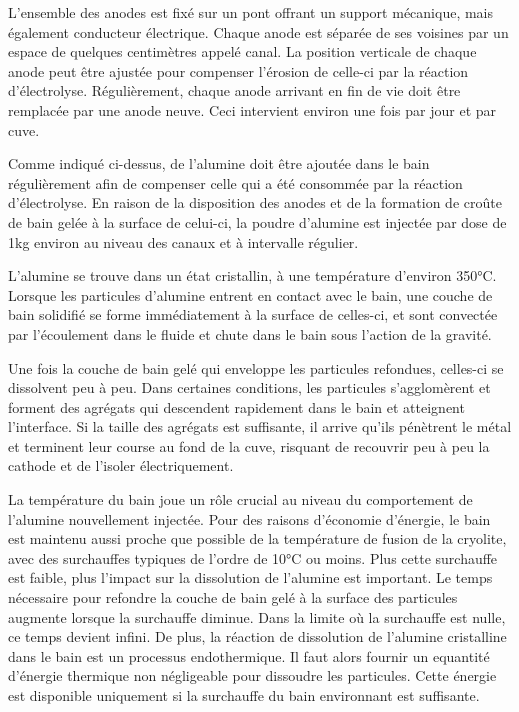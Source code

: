 L'ensemble des anodes est fixé sur un pont offrant un support
mécanique, mais également conducteur électrique. Chaque anode est
séparée de ses voisines par un espace de quelques centimètres appelé
canal. La position verticale de chaque anode peut être ajustée pour
compenser l'érosion de celle-ci par la réaction
d'électrolyse. Régulièrement, chaque anode arrivant en fin de vie doit
être remplacée par une anode neuve. Ceci intervient environ une fois
par jour et par cuve.

Comme indiqué ci-dessus, de l'alumine doit être ajoutée dans le bain
régulièrement afin de compenser celle qui a été consommée par la
réaction d'électrolyse. En raison de la disposition des anodes et de
la formation de croûte de bain gelée à la surface de celui-ci, la
poudre d'alumine est injectée par dose de \num{1}\si{\kilo\gram}
environ au niveau des canaux et à intervalle régulier.

L'alumine se trouve dans un état cristallin, à une température
d'environ \num{350}\si{\celsius}. Lorsque les particules d'alumine
entrent en contact avec le bain, une couche de bain solidifié se
forme immédiatement à la surface de celles-ci, et sont convectée par
l'écoulement dans le fluide et chute dans le bain sous l'action de
la gravité.

Une fois la couche de bain gelé qui enveloppe les particules
refondues, celles-ci se dissolvent peu à peu. Dans certaines
conditions, les particules s'agglomèrent et forment des agrégats
qui descendent rapidement dans le bain et atteignent l'interface. Si
la taille des agrégats est suffisante, il arrive qu'ils pénètrent
le métal et terminent leur course au fond de la cuve, risquant de
recouvrir peu à peu la cathode et de l'isoler électriquement.

La température du bain joue un rôle crucial au niveau du comportement
de l'alumine nouvellement injectée. Pour des raisons d'économie
d'énergie, le bain est maintenu aussi proche que possible de la
température de fusion de la cryolite, avec des surchauffes typiques de
l'ordre de \num{10}\si{\celsius} ou moins. Plus cette surchauffe est
faible, plus l'impact sur la dissolution de l'alumine est
important. Le temps nécessaire pour refondre la couche de bain gelé à
la surface des particules augmente lorsque la surchauffe diminue. Dans
la limite où la surchauffe est nulle, ce temps devient infini. De
plus, la réaction de dissolution de l'alumine cristalline dans le bain
est un processus endothermique. Il faut alors fournir un equantité
d'énergie thermique non négligeable pour dissoudre les
particules. Cette énergie est disponible uniquement si la surchauffe
du bain environnant est suffisante.

